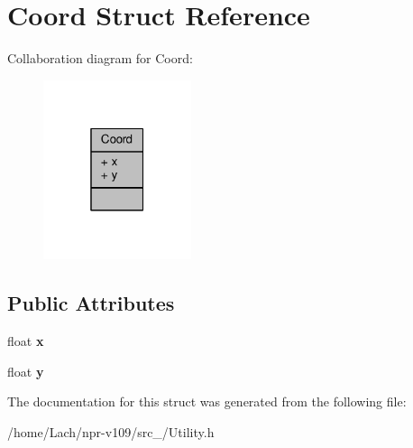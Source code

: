\hypertarget{structCoord}{}\section{Coord Struct Reference}
\label{structCoord}


Collaboration diagram for Coord\+:
\nopagebreak
\begin{figure}[H]
\begin{center}
\leavevmode
\includegraphics[width=123pt]{structCoord__coll__graph}
\end{center}
\end{figure}
\subsection*{Public Attributes}
\begin{DoxyCompactItemize}
\item 
\hypertarget{structCoord_a089b098faaca481f53834c7cd7605da5}{}\label{structCoord_a089b098faaca481f53834c7cd7605da5} 
float {\bfseries x}
\item 
\hypertarget{structCoord_a55a67a26b632758699c9f999348d9f06}{}\label{structCoord_a55a67a26b632758699c9f999348d9f06} 
float {\bfseries y}
\end{DoxyCompactItemize}


The documentation for this struct was generated from the following file\+:\begin{DoxyCompactItemize}
\item 
/home/\+Lach/npr-\/v109/src\+\_/Utility.\+h\end{DoxyCompactItemize}
